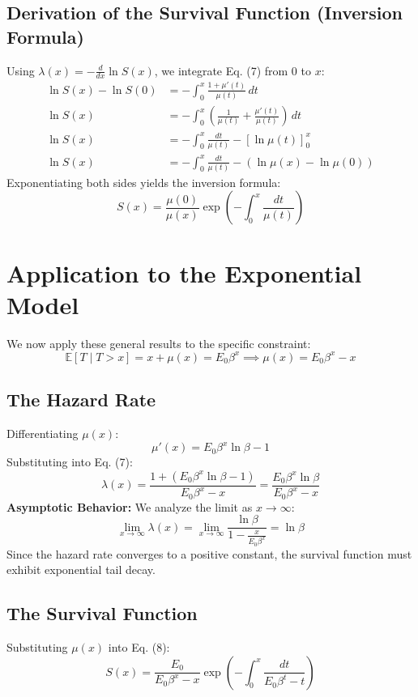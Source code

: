 \documentclass{article}
\begin{document}
	\subsection{Derivation of the Survival Function (Inversion Formula)}
	Using $\lambda(x) = -\frac{d}{dx} \ln S(x)$, we integrate Eq. (7) from $0$ to $x$:
	\begin{align*}
		\ln S(x) - \ln S(0) &= - \int_0^x \frac{1 + \mu'(t)}{\mu(t)} \, dt \\
		\ln S(x) &= - \int_0^x \left( \frac{1}{\mu(t)} + \frac{\mu'(t)}{\mu(t)} \right) \, dt \\
		\ln S(x) &= - \int_0^x \frac{dt}{\mu(t)} - \left[ \ln \mu(t) \right]_0^x \\
		\ln S(x) &= - \int_0^x \frac{dt}{\mu(t)} - (\ln \mu(x) - \ln \mu(0))
	\end{align*}
	Exponentiating both sides yields the inversion formula:
	\begin{equation}
		S(x) = \frac{\mu(0)}{\mu(x)} \exp \left( - \int_0^x \frac{dt}{\mu(t)} \right)
	\end{equation}
	
	\section{Application to the Exponential Model}
	
	We now apply these general results to the specific constraint:
	\begin{equation}
		\mathbb{E}[T \mid T > x] = x + \mu(x) = E_0 \beta^x \implies \mu(x) = E_0 \beta^x - x
	\end{equation}
	
	\subsection{The Hazard Rate}
	Differentiating $\mu(x)$:
	$$ \mu'(x) = E_0 \beta^x \ln \beta - 1 $$
	Substituting into Eq. (7):
	\begin{equation}
		\lambda(x) = \frac{1 + (E_0 \beta^x \ln \beta - 1)}{E_0 \beta^x - x} = \frac{E_0 \beta^x \ln \beta}{E_0 \beta^x - x}
	\end{equation}
	\textbf{Asymptotic Behavior:}
	We analyze the limit as $x \to \infty$:
	$$ \lim_{x \to \infty} \lambda(x) = \lim_{x \to \infty} \frac{\ln \beta}{1 - \frac{x}{E_0 \beta^x}} = \ln \beta $$
	Since the hazard rate converges to a positive constant, the survival function must exhibit exponential tail decay.
	
	\subsection{The Survival Function}
	Substituting $\mu(x)$ into Eq. (8):
	\begin{equation}
		S(x) = \frac{E_0}{E_0 \beta^x - x} \exp \left( - \int_0^x \frac{dt}{E_0 \beta^t - t} \right)
	\end{equation}
	
\end{document}
